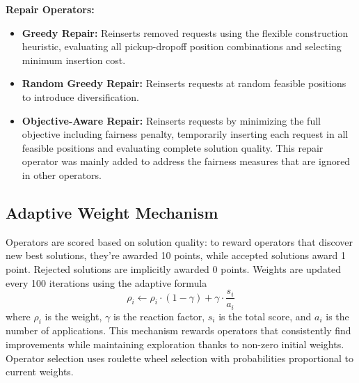 \documentclass[a4paper]{scrartcl}
\begin{document}
\textbf{Repair Operators:}
\begin{itemize}
    \item \textbf{Greedy Repair:} Reinserts removed requests using the flexible construction heuristic, evaluating all pickup-dropoff position combinations and selecting minimum insertion cost.
    \item \textbf{Random Greedy Repair:} Reinserts requests at random feasible positions to introduce diversification.
    \item \textbf{Objective-Aware Repair:} Reinserts requests by minimizing the full objective including fairness
    penalty, temporarily inserting each request in all feasible positions and evaluating complete solution quality.
    This repair operator was mainly added to address the fairness measures that are ignored in other operators.
\end{itemize}

\subsection{Adaptive Weight Mechanism}
Operators are scored based on solution quality: to reward operators that discover new best solutions, they're awarded
10 points, while accepted solutions award 1 point.
Rejected solutions are implicitly awarded 0 points.
Weights are updated every 100 iterations using the adaptive formula
\[\rho_i \leftarrow \rho_i \cdot (1-\gamma) + \gamma \cdot \frac{s_i}{a_i}\] where $\rho_i$ is the weight, $\gamma$
is the reaction factor, $s_i$ is the total score, and $a_i$ is the number of applications.
This mechanism rewards operators that consistently find improvements while maintaining exploration thanks to non-zero
initial weights.
Operator selection uses roulette wheel selection with probabilities proportional to current weights.
\end{document}
